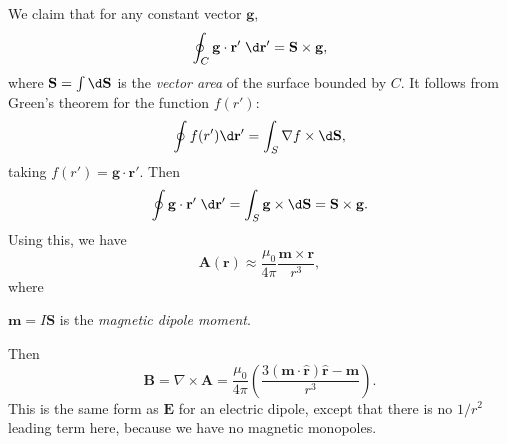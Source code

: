 \documentclass[a4paper]{article}
\begin{document}
\begin{eg}
  We claim that for any constant vector $\mathbf{g}$, 
  \[
    \oint_C \mathbf{g}\cdot \mathbf{r}' \;\d \mathbf{r}' = \mathbf{S}\times \mathbf{g},
  \]
  where $\mathbf{S} = \int \d \mathbf{\mathbf{S}}$ is the \emph{vector area} of the surface bounded by $C$. It follows from Green's theorem for the function $f(r')$:
  \[
    \oint f(r')\d \mathbf{r}' = \int_S \nabla f\times\d \mathbf{S},
  \]
  taking $f(r') = \mathbf{g}\cdot \mathbf{r}'$. Then
  \[
    \oint \mathbf{g}\cdot \mathbf{r}'\;\d \mathbf{r}' = \int_S \mathbf{g}\times \d \mathbf{S} = \mathbf{S}\times \mathbf{g}.
  \]
  Using this, we have
  \[
    \mathbf{A}(\mathbf{r}) \approx \frac{\mu_0}{4\pi}\frac{\mathbf{m}\times \mathbf{r}}{r^3},
  \]
  where
  \begin{defi}
    $\mathbf{m} = I\mathbf{S}$ is the \emph{magnetic dipole moment}.
  \end{defi}
  Then
  \[
    \mathbf{B} = \nabla\times \mathbf{A} = \frac{\mu_0}{4\pi}\left(\frac{3(\mathbf{m}\cdot \hat{\mathbf{r}})\hat{\mathbf{r}} - \mathbf{m}}{r^3}\right).
  \]
  This is the same form as $\mathbf{E}$ for an electric dipole, except that there is no $1/r^2$ leading term here, because we have no magnetic monopoles.
\end{eg}
\end{document}
